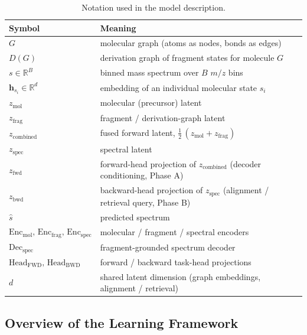 \begin{table}[H]
    \centering
    \caption{Notation used in the model description.}
    \label{tab:notation}
    \begin{tabular}{ll}
        \hline
        Symbol & Meaning \\
        \hline
        $G$ & molecular graph (atoms as nodes, bonds as edges) \\
        $D(G)$ & derivation graph of fragment states for molecule $G$ \\
        $s \in \mathbb{R}^{B}$ & binned mass spectrum over $B$ $m/z$ bins \\
        $\mathbf{h}_{s_i} \in \mathbb{R}^{d}$ & embedding of an individual molecular state $s_i$ \\
        $z_{\mathrm{mol}}$ & molecular (precursor) latent \\
        $z_{\mathrm{frag}}$ & fragment / derivation-graph latent \\
        $z_{\mathrm{combined}}$ & fused forward latent, $\tfrac{1}{2}\,(z_{\mathrm{mol}}+z_{\mathrm{frag}})$ \\
        $z_{\mathrm{spec}}$ & spectral latent \\
        $z_{\mathrm{fwd}}$ & forward-head projection of $z_{\mathrm{combined}}$ (decoder conditioning, Phase A) \\
        $z_{\mathrm{bwd}}$ & backward-head projection of $z_{\mathrm{spec}}$ (alignment / retrieval query, Phase B) \\
        $\hat{s}$ & predicted spectrum \\
        $\mathrm{Enc}_{\mathrm{mol}},\,\mathrm{Enc}_{\mathrm{frag}},\,\mathrm{Enc}_{\mathrm{spec}}$ & molecular / fragment / spectral encoders \\
        $\mathrm{Dec}_{\mathrm{spec}}$ & fragment-grounded spectrum decoder \\
        $\text{Head}_{\mathrm{FWD}},\,\text{Head}_{\mathrm{BWD}}$ & forward / backward task-head projections \\
        $d$ & shared latent dimension (graph embeddings, alignment / retrieval) \\
        \hline
    \end{tabular}
\end{table}

\subsection{Overview of the Learning Framework}

